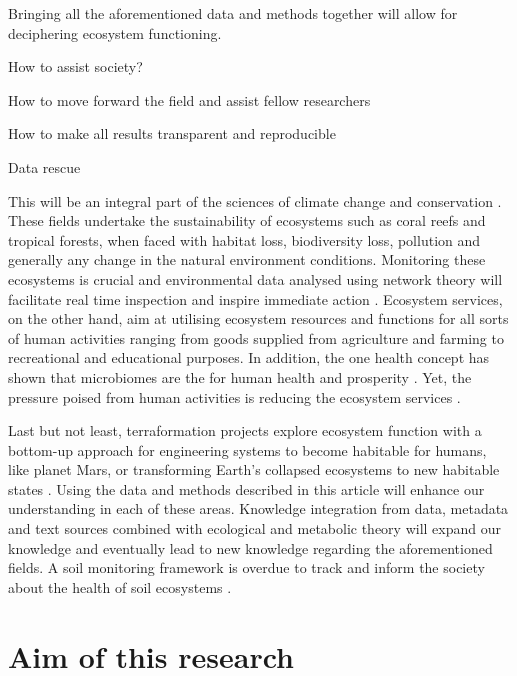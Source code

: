 Bringing all the aforementioned data and methods together will allow for deciphering ecosystem functioning.

How to assist society?

How to move forward the field and assist fellow researchers 

How to make all results transparent and reproducible 

Data rescue 
\parencite{michener_nongeospatial_1997}

This will be an integral part of the sciences of climate change
and conservation \parencite{cavicchioli2019scientists}. These fields undertake the
sustainability of ecosystems such as coral reefs and tropical forests, when
faced with habitat loss, biodiversity loss, pollution and generally any change
in the natural environment conditions. Monitoring these ecosystems is crucial
and environmental data analysed using network theory will facilitate real time
inspection and inspire immediate action \parencite{derocles2018Biomonitoring}.
Ecosystem services, on the other hand, aim at utilising ecosystem resources
and functions for all sorts of human activities ranging from goods supplied
from agriculture and farming \parencite{alvarez-silva2017Compartmentalized} to
recreational and educational purposes. In addition, the one health concept has
shown that microbiomes are the for human health and prosperity
\parencite{banerjee2023Soil, lehmann2020concept}. Yet, the pressure poised from human activities
is reducing the ecosystem services \parencite{rillig2023Increasing}.


Last but not least, terraformation
projects explore ecosystem function with a bottom-up approach for engineering
systems to become habitable for humans, like planet Mars, or transforming
Earth's collapsed ecosystems to new habitable states
\parencite{conde-pueyo2020Synthetic}. Using the data and methods described in this
article will enhance our understanding in each of these areas. Knowledge
integration from data, metadata and text sources combined with ecological and
metabolic theory will expand our knowledge and eventually lead to new
knowledge regarding the aforementioned fields. A soil monitoring framework 
is overdue to track and inform the society about the health of 
soil ecosystems \parencite{guerra2021tracking}.

\section{Aim of this research}
\label{sec:aim}

